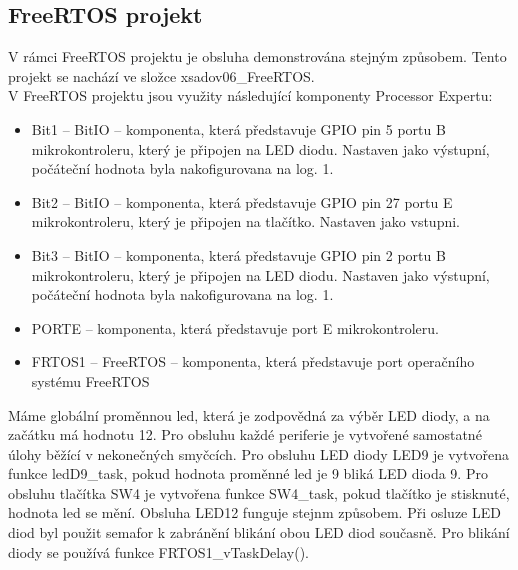 \documentclass[11pt,a4paper]{article}
\begin{document}
    \subsection{FreeRTOS projekt}
    V rámci FreeRTOS projektu je obsluha demonstrována stejným způsobem. Tento projekt se nachází ve složce xsadov06\_FreeRTOS.\\

    V FreeRTOS projektu jsou využity následující komponenty Processor Expertu:
    \begin{itemize}
        \item Bit1 – BitIO – komponenta, která představuje GPIO pin 5 portu B mikrokontroleru, který je            připojen na LED diodu. Nastaven jako výstupní, počáteční hodnota byla nakofigurovana na log. 1.
        \item Bit2 – BitIO – komponenta, která představuje GPIO pin 27 portu E mikrokontroleru, který je           připojen na tlačítko. Nastaven jako vstupni.
        \item Bit3 – BitIO – komponenta, která představuje GPIO pin 2 portu B mikrokontroleru, který je            připojen na LED diodu. Nastaven jako výstupní, počáteční hodnota byla nakofigurovana na log. 1.
        \item PORTE – komponenta, která představuje port E mikrokontroleru.
        \item FRTOS1 – FreeRTOS – komponenta, která představuje port operačního systému FreeRTOS
    \end{itemize}
    Máme globální proměnnou led, která je zodpovědná za výběr LED diody, a na začátku má hodnotu 12.
    Pro obsluhu každé periferie je vytvořené samostatné úlohy běžící v nekonečných smyčcích. Pro obsluhu LED diody LED9 je vytvořena funkce ledD9\_task, pokud hodnota proměnné led je 9 bliká LED dioda 9. Pro obsluhu tlačítka SW4 je vytvořena funkce SW4\_task, pokud tlačítko je stisknuté, hodnota led se mění. Obsluha LED12 funguje stejnm způsobem. Při osluze LED diod byl použit semafor k zabránění blikání obou LED diod současně.
    Pro blikání diody se používá funkce FRTOS1\_vTaskDelay().

\newpage %

\makeatletter
\makeatother

\nocite{*}
\begin{flushleft}
    
\end{flushleft}
\end{document}
